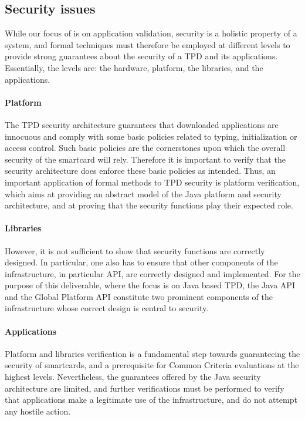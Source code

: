 \subsection{Security issues}
While our focus of is on application validation,
security is a holistic property of a system, and formal techniques
must therefore be employed at different levels to provide strong
guarantees about the security of a TPD and its applications.
Essentially, the levels are: the hardware, platform, the libraries,
and the applications.



\paragraph*{Platform} The TPD security architecture guarantees that
downloaded applications are innocuous and comply with some basic
policies related to typing, initialization or access control. Such
basic policies are the cornerstones upon which the overall security of
the smartcard will rely. Therefore it is important to verify that the
security architecture does enforce these basic policies as
intended. Thus, an important application of formal methods to TPD
security is platform verification, which aims at providing an abstract
model of the Java platform and security architecture, and at proving
that the security functions play their expected role.

\paragraph*{Libraries} However, it is not sufficient to show that
security functions are correctly designed. In particular, one also has
to ensure that other components of the infrastructure, in particular
API, are correctly designed and implemented. For the purpose of this
deliverable, where the focus is on Java based TPD, the Java API and
the Global Platform API constitute two prominent components of the
infrastructure whose correct design is central to security. 


\paragraph*{Applications} 
Platform and libraries verification is a fundamental step towards
guaranteeing the security of smartcards, and a prerequisite for Common
Criteria evaluations at the highest levels. Nevertheless, the
guarantees offered by the Java security architecture are limited, and
further verifications must be performed to verify that applications
make a legitimate use of the infrastructure, and do not attempt any
hostile action.


